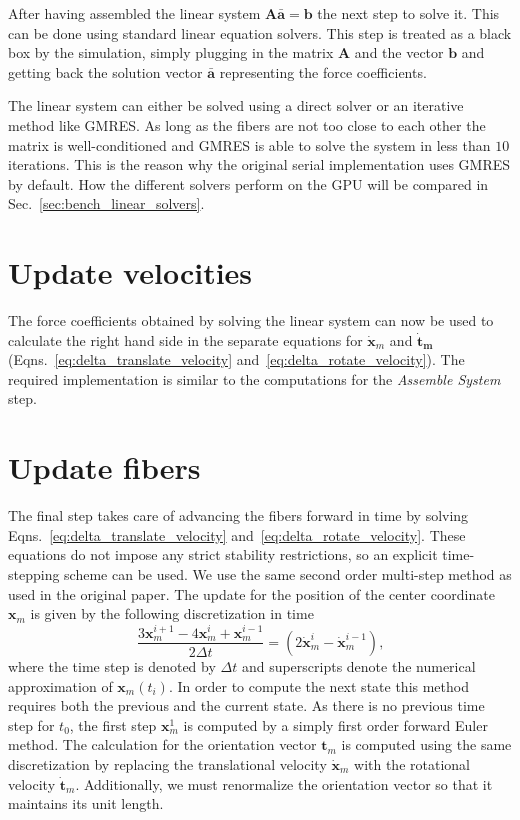 After having assembled the linear system $\mathbf{A}\mathbf{\bar{a}}=\mathbf{b}$ the next step to solve it. This can be done using standard linear equation solvers. This step is treated as a black box by the simulation, simply plugging in the matrix $\mathbf{A}$ and the vector $\mathbf{b}$ and getting back the solution vector $\mathbf{\bar{a}}$ representing the force coefficients.

The linear system can either be solved using a direct solver or an iterative method like GMRES. As long as the fibers are not too close to each other the matrix is well-conditioned and GMRES is able to solve the system in less than $10$ iterations. This is the reason why the original serial implementation uses GMRES by default. How the different solvers perform on the GPU will be compared in Sec.~\ref{sec:bench_linear_solvers}.

\section{Update velocities}

The force coefficients obtained by solving the linear system can now be used to calculate the right hand side in the separate equations for $\mathbf{\dot{x}}_m$ and $\mathbf{\dot{t}_m}$ (Eqns.~\eqref{eq:delta_translate_velocity} and~\eqref{eq:delta_rotate_velocity}). The required implementation is similar to the computations for the \emph{Assemble System} step.

\section{Update fibers}
\label{sec:serial_update_fibers}

The final step takes care of advancing the fibers forward in time by solving Eqns.~\eqref{eq:delta_translate_velocity} and~\eqref{eq:delta_rotate_velocity}. These equations do not impose any strict stability restrictions, so an explicit time-stepping scheme can be used. We use the same second order multi-step method as used in the original paper. The update for the position of the center coordinate $\mathbf{x}_m$ is given by the following discretization in time
\begin{equation}
  \label{eq:time_discretization}
  \frac{3\mathbf{x}_m^{i+1} - 4\mathbf{x}_m^{i} + \mathbf{x}_m^{i-1}}{2 \Delta t} = (2\mathbf{\dot{x}}_m^{i} - \mathbf{\dot{x}}_m^{i-1}) \text{,}
\end{equation}
where the time step is denoted by $\Delta t$ and superscripts denote the numerical approximation of $\mathbf{x}_m(t_i)$. In order to compute the next state this method requires both the previous and the current state. As there is no previous time step for $t_0$, the first step $\mathbf{x}_{m}^{1}$ is computed by a simply first order forward Euler method. The calculation for the orientation vector $\mathbf{t}_m$ is computed using the same discretization by replacing the translational velocity $\mathbf{\dot{x}}_m$ with the rotational velocity $\mathbf{\dot{t}}_m$. Additionally, we must renormalize the orientation vector so that it maintains its unit length.

